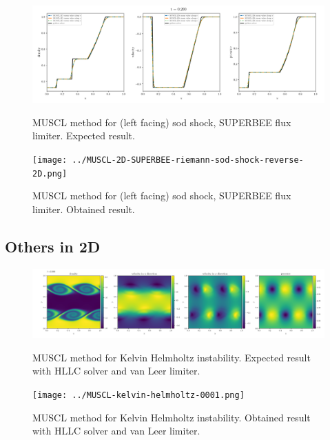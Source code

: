     \begin{figure}[htbp]
        \centering
        \includegraphics[width=.9\textwidth]{./figures/MUSCL-2D-SUPERBEE-riemann-sod-shock-reverse-2D.png}%
        \caption{MUSCL method for (left facing) sod shock, SUPERBEE flux limiter. Expected result.}
        \texttt{[image: ../MUSCL-2D-SUPERBEE-riemann-sod-shock-reverse-2D.png]}%
        \caption{MUSCL method for (left facing) sod shock, SUPERBEE flux limiter. Obtained result.}
    \end{figure}







\clearpage
\subsection{Others in 2D}

    \begin{figure}[htbp]
        \centering
        \includegraphics[width=.9\textwidth]{./figures/MUSCL-kelvin-helmholtz-0001.png}%
        \caption{MUSCL method for Kelvin Helmholtz instability. Expected result with HLLC solver and van Leer limiter.}
        \texttt{[image: ../MUSCL-kelvin-helmholtz-0001.png]}%
        \caption{MUSCL method for Kelvin Helmholtz instability. Obtained result with HLLC solver and van Leer limiter.}
    \end{figure}







